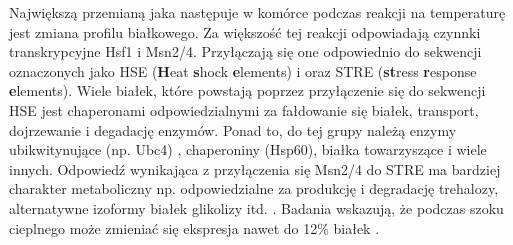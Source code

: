 \documentclass{pracamgr}
\begin{document}
 Największą przemianą jaka następuje w komórce podczas reakcji na temperaturę jest zmiana profilu białkowego. Za większość tej 
 reakcji odpowiadają czynnki transkrypcyjne Hsf1 i Msn2/4. Przyłączają się one odpowiednio do sekwencji oznaczonych jako 
 HSE (\textbf{H}eat \textbf{s}hock \textbf{e}lements) i oraz STRE (\textbf{st}ress \textbf{r}esponse \textbf{e}lements).
 Wiele białek, które powstają poprzez przyłączenie się do sekwencji HSE
 jest chaperonami odpowiedzialnymi za fałdowanie się białek, transport, dojrzewanie i degadację enzymów. Ponad to, do tej grupy
 należą enzymy ubikwitynujące (np. Ubc4) , chaperoniny (Hsp60), białka towarzyszące i wiele innych. Odpowiedź wynikająca z 
 przyłączenia się Msn2/4 do STRE ma bardziej charakter metaboliczny np. odpowiedzialne za produkcję i degradację trehalozy, 
 alternatywne izoformy białek glikolizy itd. \cite{MsnContraHsf1}. Badania wskazują, że podczas szoku cieplnego może zmieniać się
 ekspresja nawet do 12\% białek \cite{TransciptomeUponHeatShock}.
 
\end{document}
